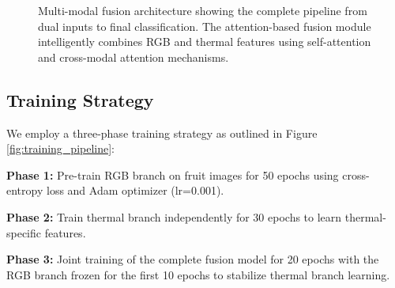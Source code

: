\documentclass[conference]{IEEEtran}
\begin{document}
\begin{figure}[htbp]
{
}
\caption{Multi-modal fusion architecture showing the complete pipeline from dual inputs to final classification. The attention-based fusion module intelligently combines RGB and thermal features using self-attention and cross-modal attention mechanisms.}
\label{fig:fusion_architecture}
\end{figure}

\subsection{Training Strategy}

We employ a three-phase training strategy as outlined in Figure \ref{fig:training_pipeline}:

\textbf{Phase 1:} Pre-train RGB branch on fruit images for 50 epochs using cross-entropy loss and Adam optimizer (lr=0.001).

\textbf{Phase 2:} Train thermal branch independently for 30 epochs to learn thermal-specific features.

\textbf{Phase 3:} Joint training of the complete fusion model for 20 epochs with the RGB branch frozen for the first 10 epochs to stabilize thermal branch learning.
\end{document}
